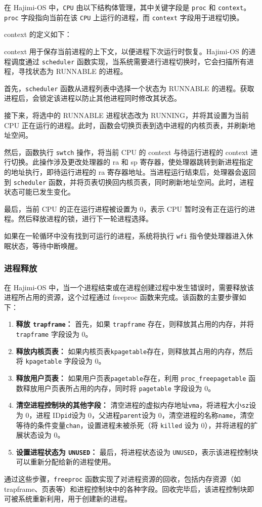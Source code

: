 \documentclass[UTF8]{article}
\begin{document}
在 Hajimi-OS 中，\texttt{CPU} 由以下结构体管理，其中关键字段是 \texttt{proc} 和 \texttt{context}。\texttt{proc} 字段指向当前在该 \texttt{CPU} 上运行的进程，而 \texttt{context} 字段用于进程切换。

context 的定义如下：

context 用于保存当前进程的上下文，以便进程下次运行时恢复。Hajimi-OS 的进程调度通过 \texttt{scheduler} 函数实现，当系统需要进行进程切换时，它会扫描所有进程，寻找状态为 RUNNABLE 的进程。

首先，\texttt{scheduler} 函数从进程列表中选择一个状态为 RUNNABLE 的进程。获取进程后，会锁定该进程以防止其他进程同时修改其状态。

接下来，将选中的 RUNNABLE 进程状态改为 RUNNING，并将其设置为当前 CPU 正在运行的进程。此时，函数会切换页表到选中进程的内核页表，并刷新地址空间。

然后，函数执行 \texttt{swtch} 操作，将当前 CPU 的 context 与待运行进程的 context 进行切换。此操作涉及更改处理器的 ra 和 sp 寄存器，使处理器跳转到新进程指定的地址执行，即待运行进程的 ra 寄存器地址。当进程运行结束后，处理器会返回到 \texttt{scheduler} 函数，并将页表切换回内核页表，同时刷新地址空间。此时，进程状态可能已发生变化。

最后，当前 CPU 的正在运行进程被设置为 0，表示 CPU 暂时没有正在运行的进程。然后释放进程的锁，进行下一轮进程选择。

如果在一轮循环中没有找到可运行的进程，系统将执行 \texttt{wfi} 指令使处理器进入休眠状态，等待中断唤醒。

\subsubsection{进程释放}
在 Hajimi-OS 中，当一个进程结束或在进程创建过程中发生错误时，需要释放该进程所占用的资源，这个过程通过 freeproc 函数来完成。该函数的主要步骤如下：
\begin{enumerate}[label=\textbf{\arabic*}., wide, labelwidth=!, labelindent=0pt]
  \item \textbf{释放 \texttt{trapframe}：} 首先，如果 \texttt{trapframe} 存在，则释放其占用的内存，并将 \texttt{trapframe} 字段设为 0。
  \item \textbf{释放内核页表：} 如果内核页表\texttt{kpagetable}存在，则释放其占用的内存，然后将 \texttt{kpagetable} 字段设为 0。
  \item \textbf{释放用户页表：} 如果用户页表\texttt{pagetable}存在，利用 \texttt{proc\_freepagetable} 函数释放用户页表所占用的内存，同时将 \texttt{pagetable} 字段设为 0。
  \item \textbf{清空进程控制块的其他字段：} 清空进程的虚拟内存地址\texttt{vma}，将进程大小\texttt{sz}设为 0，进程 ID\texttt{pid}设为 0，父进程\texttt{parent}设为 0，清空进程的名称\texttt{name}，清空等待的条件变量\texttt{chan}，设置进程未被杀死（将 \texttt{killed} 设为 0），并将进程的扩展状态设为 0。
  \item \textbf{设置进程状态为 \texttt{UNUSED}：} 最后，将进程状态设为 \texttt{UNUSED}，表示该进程控制块可以重新分配给新的进程使用。
\end{enumerate}
通过这些步骤，\texttt{freeproc} 函数实现了对进程资源的回收，包括内存资源（如 trapframe、页表等）和进程控制块中的各种字段。回收完毕后，该进程控制块即可被系统重新利用，用于创建新的进程。
\end{document}
